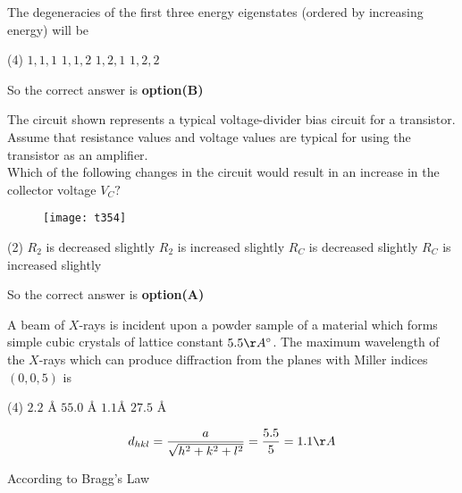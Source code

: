 \begin{questions}
\begin{minipage}{\textwidth}
	The degeneracies of the first three energy eigenstates (ordered by increasing energy) will be
\end{minipage}
\begin{tasks}(4)
	\task[\textbf{A.}] $1,1,1$
	\task[\textbf{B.}]   $1,1,2$
	\task[\textbf{C.}] $1,2,1$
	\task[\textbf{D.}] $1,2,2$
\end{tasks}
\begin{answer}
	So the correct answer is \textbf{option(B)}
\end{answer}
\begin{minipage}{\textwidth}
	\question The circuit shown represents a typical voltage-divider bias circuit for a transistor. Assume that resistance values and voltage values are typical for using the transistor as an amplifier.\\
	Which of the following changes in the circuit would result in an increase in the collector voltage $V_{C} ?$
\end{minipage}
\begin{figure}[H]
	\centering
	\texttt{[image: t354]}
\end{figure}
\begin{tasks}(2)
	\task[\textbf{A.}]   $R_{2}$ is decreased slightly
	\task[\textbf{B.}]   $R_{2}$ is increased slightly
	\task[\textbf{C.}]   $R_{C}$ is decreased slightly
	\task[\textbf{D.}] $R_{C}$ is increased slightly
\end{tasks}
\begin{answer}
	So the correct answer is \textbf{option(A)}
\end{answer}
\begin{minipage}{\textwidth}
	\question A beam of $X$-rays is incident upon a powder sample of a material which forms simple cubic crystals of lattice constant $5.5 \AA^{\circ}$. The maximum wavelength of the $X$-rays which can produce diffraction from the planes with Miller indices $(0,0,5)$ is
\end{minipage}
\begin{tasks}(4)
	\task[\textbf{A.}] $2.2$ \AA
	\task[\textbf{B.}] $55.0$ \AA
	\task[\textbf{C.}] $1.1 $\AA
	\task[\textbf{D.}] $27.5$ \AA
\end{tasks}
\begin{answer}
	$$
	d_{h k l}=\frac{a}{\sqrt{h^{2}+k^{2}+l^{2}}}=\frac{5.5}{5}=1.1 \AA
	$$
	
	According to Bragg's Law
	

\end{answer}
\end{questions}
